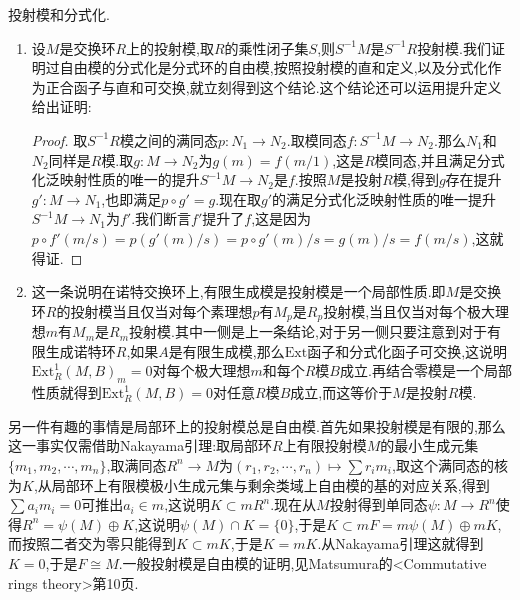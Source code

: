 投射模和分式化.
\begin{enumerate}
	\item 设$M$是交换环$R$上的投射模,取$R$的乘性闭子集$S$,则$S^{-1}M$是$S^{-1}R$投射模.我们证明过自由模的分式化是分式环的自由模,按照投射模的直和定义,以及分式化作为正合函子与直和可交换,就立刻得到这个结论.这个结论还可以运用提升定义给出证明:
	\begin{proof}
	
	取$S^{-1}R$模之间的满同态$p:N_1\to N_2$.取模同态$f:S^{-1}M\to N_2$.那么$N_1$和$N_2$同样是$R$模.取$g:M\to N_2$为$g(m)=f(m/1)$,这是$R$模同态,并且满足分式化泛映射性质的唯一的提升$S^{-1}M\to N_2$是$f$.按照$M$是投射$R$模,得到$g$存在提升$g':M\to N_1$,也即满足$p\circ g'=g$.现在取$g'$的满足分式化泛映射性质的唯一提升$S^{-1}M\to N_1$为$f'$.我们断言$f'$提升了$f$,这是因为$p\circ f'(m/s)=p(g'(m)/s)=p\circ g'(m)/s=g(m)/s=f(m/s)$,这就得证.
	\end{proof}
    \item 这一条说明在诺特交换环上,有限生成模是投射模是一个局部性质.即$M$是交换环$R$的投射模当且仅当对每个素理想$p$有$M_p$是$R_p$投射模,当且仅当对每个极大理想$m$有$M_m$是$R_m$投射模.其中一侧是上一条结论,对于另一侧只要注意到对于有限生成诺特环$R$,如果$A$是有限生成模,那么$\mathrm{Ext}$函子和分式化函子可交换,这说明$\mathrm{Ext}_R^1(M,B)_m=0$对每个极大理想$m$和每个$R$模$B$成立.再结合零模是一个局部性质就得到$\mathrm{Ext}_R^1(M,B)=0$对任意$R$模$B$成立,而这等价于$M$是投射$R$模.
\end{enumerate}

另一件有趣的事情是局部环上的投射模总是自由模.首先如果投射模是有限的,那么这一事实仅需借助Nakayama引理:取局部环$R$上有限投射模$M$的最小生成元集$\{m_1,m_2,\cdots,m_n\}$,取满同态$R^n\to M$为$(r_1,r_2,\cdots,r_n)\mapsto\sum r_im_i$,取这个满同态的核为$K$,从局部环上有限模极小生成元集与剩余类域上自由模的基的对应关系,得到$\sum a_im_i=0$可推出$a_i\in m$,这说明$K\subset mR^n$.现在从$M$投射得到单同态$\psi:M\to R^n$使得$R^n=\psi(M)\oplus K$,这说明$\psi(M)\cap K=\{0\}$,于是$K\subset mF=m\psi(M)\oplus mK$,而按照二者交为零只能得到$K\subset mK$,于是$K=mK$.从Nakayama引理这就得到$K=0$,于是$F\cong M$.一般投射模是自由模的证明,见Matsumura的<Commutative rings theory>第10页.

